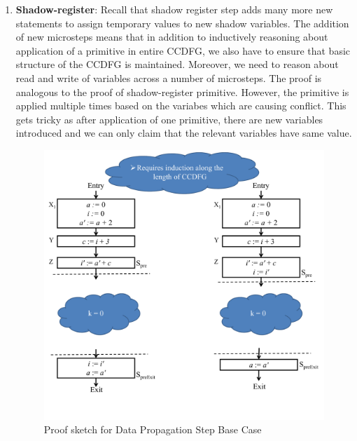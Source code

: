 \begin{enumerate}
The second step involves moving the microstep into the previous iteration. 
It requies removing the microstep, referred as $mstep$ from beginning of $S_{loop}$ and adding it to end of $S_{loop}$. 
Also, $mstep$ is added in $S_{pre}$ and removed 
from $S_{preExit}$. The proof of this step requires non-trivial induction as explained in Figures~\ref{fig:proof-after-data-propagation-basecase} and ~\ref{fig:proof-after-inductive-step}. 
These stages need to be
repeated for as many variables as are in conflict. 

\item \textbf{Shadow-register}: Recall that shadow register step adds many more new statements to assign temporary values to 
new shadow variables. The addition of new microsteps means that in addition to inductively reasoning about application of a primitive in entire CCDFG, we also have to ensure that basic structure of the CCDFG is maintained. Moreover, we need to reason about read and write of 
variables across a number of microsteps. The proof is analogous to the proof of shadow-register primitive. However, the primitive is applied multiple times based on the variabes which are causing conflict. This gets tricky as after application of one primitive, there are new variables introduced and we can only claim that the relevant variables have same value.

\begin{figure}[t!]
\begin{center}
\includegraphics[width=5.5in]{fig-proposal/proof-after-data-propagation-basecase}
\end{center}
\caption{Proof sketch for Data Propagation Step Base Case}
\label{fig:proof-after-data-propagation-basecase}
\end{figure}


\end{enumerate}

